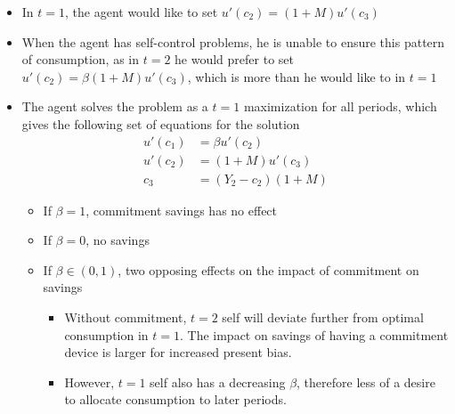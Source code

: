 \documentclass[a4paper]{article}
\begin{document}
\begin{itemize}
    \item In $t=1$, the agent would like to set $u'(c_2)=(1+M)u'(c_3)$
    \item When the agent has self-control problems, he is unable to ensure this pattern of consumption, as in $t=2$ he would prefer to set $u'(c_2)=\beta(1+M)u'(c_3)$, which is more than he would like to in $t=1$
    \item The agent solves the problem as a $t=1$ maximization for all periods, which gives the following set of equations for the solution
    \begin{align*}
        u'(c_1)&=\beta u'(c_2) \\
        u'(c_2)&=(1+M) u'(c_3) \\
        c_3&=(Y_2-c_2)(1+M)
    \end{align*}
    \begin{itemize}
        \item If $\beta=1$, commitment savings has no effect
        \item If $\beta=0$, no savings
        \item If $\beta\in(0,1)$, two opposing effects on the impact of commitment on savings
        \begin{itemize}
            \item Without commitment, $t=2$ self will deviate further from optimal consumption in $t=1$. The impact on savings of having a commitment device is larger for increased present bias.
            \item However, $t=1$ self also has a decreasing $\beta$, therefore less of a desire to allocate consumption to later periods.
        \end{itemize}
    \end{itemize}
\end{itemize}
\end{document}
